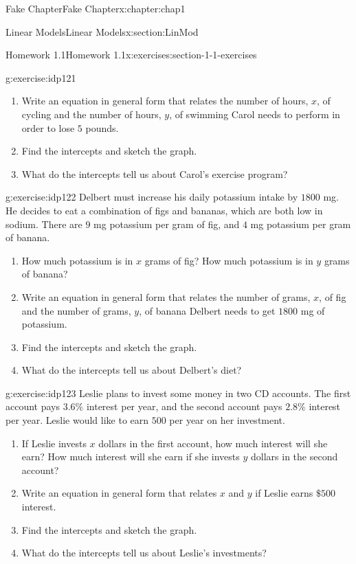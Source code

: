 \documentclass[oneside,10pt,]{book}
\numberwithin{equation}{section}
\begin{document}
\begin{chapterptx}{Fake Chapter}{}{Fake Chapter}{}{}{x:chapter:chap1}
\begin{sectionptx}{Linear Models}{}{Linear Models}{}{}{x:section:LinMod}
\begin{exercises-subsection}{Homework 1.1}{}{Homework 1.1}{}{}{x:exercises:section-1-1-exercises}
\begin{divisionexercise}{26}{}{}{g:exercise:idp121}
\begin{enumerate}[label=\alph*]
\item{}Write an equation in general form that relates the number of hours, \(x\), of cycling and the number of hours, \(y\), of swimming Carol needs to perform in order to lose \(5\) pounds.%
\item{}Find the intercepts and sketch the graph.%
\item{}What do the intercepts tell us about Carol's exercise program?%
\end{enumerate}
\end{divisionexercise}%
\begin{divisionexercise}{27}{}{}{g:exercise:idp122}%
Delbert must increase his daily potassium intake by \(1800\) mg. He decides to eat a combination of figs and bananas, which are both low in sodium. There are \(9\) mg potassium per gram of fig, and \(4\) mg potassium per gram of banana.%
%
\begin{enumerate}[label=\alph*]
\item{}How much potassium is in \(x\) grams of fig? How much potassium is in \(y\) grams of banana?%
\item{}Write an equation in general form that relates the number of grams, \(x\), of fig and the number of grams, \(y\), of banana Delbert needs to get \(1800\) mg of potassium.%
\item{}Find the intercepts and sketch the graph.%
\item{}What do the intercepts tell us about Delbert's diet?%
\end{enumerate}
\end{divisionexercise}%
\begin{divisionexercise}{28}{}{}{g:exercise:idp123}%
Leslie plans to invest some money in two CD accounts. The first account pays \(3.6\%\) interest per year, and the second account pays \(2.8\%\) interest per year. Leslie would like to earn \textdollar{}\(500\) per year on her investment.%
%
\begin{enumerate}[label=\alph*]
\item{}If Leslie invests \(x\) dollars in the first account, how much interest will she earn? How much interest will she earn if she invests \(y\) dollars in the second account?%
\item{}Write an equation in general form that relates \(x\) and \(y\) if Leslie earns \(\$500\) interest.%
\item{}Find the intercepts and sketch the graph.%
\item{}What do the intercepts tell us about Leslie's investments?%
\end{enumerate}

\end{divisionexercise}
\end{exercises-subsection}
\end{sectionptx}
\end{chapterptx}
\end{document}
